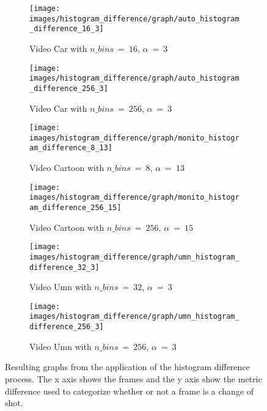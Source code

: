 \documentclass[journal]{IEEEtran}
\begin{document}
\begin{figure}
	\centering
	\begin{subfigure}{0.23\textwidth}
		\centering
		\texttt{[image: images/histogram\_difference/graph/auto\_histogram\_difference\_16\_3]} 
		\caption{Video Car with $n\_bins~=~16$, $\alpha~=~3$}
		\label{fig:histogram_difference:graph:car_16_3} 
	\end{subfigure}
	\centering
	\begin{subfigure}{0.23\textwidth}
		\centering
		\texttt{[image: images/histogram\_difference/graph/auto\_histogram\_difference\_256\_3]} 
		\caption{Video Car with $n\_bins~=~256$, $\alpha~=~3$}
		\label{fig:histogram_difference:graph:car_256_3} 
	\end{subfigure}


	\centering
	\begin{subfigure}{0.23\textwidth}
		\centering
		\texttt{[image: images/histogram\_difference/graph/monito\_histogram\_difference\_8\_13]} 
		\caption{Video Cartoon with $n\_bins~=~8$, $\alpha~=~13$}
		\label{fig:histogram_difference:graph:cartoon_8_13} 
	\end{subfigure}
	\centering
	\begin{subfigure}{0.23\textwidth}
		\centering
		\texttt{[image: images/histogram\_difference/graph/monito\_histogram\_difference\_256\_15]} 
		\caption{Video Cartoon with $n\_bins~=~256$, $\alpha~=~15$}
		\label{fig:histogram_difference:graph:cartoon_256_15} 
	\end{subfigure}


	\centering
	\begin{subfigure}{0.23\textwidth}
		\centering
		\texttt{[image: images/histogram\_difference/graph/umn\_histogram\_difference\_32\_3]} 
		\caption{Video Umn with $n\_bins~=~32$, $\alpha~=~3$}
		\label{fig:histogram_difference:graph:umn_32_3} 
	\end{subfigure}
	\centering
	\begin{subfigure}{0.23\textwidth}
		\centering
		\texttt{[image: images/histogram\_difference/graph/umn\_histogram\_difference\_256\_3]} 
		\caption{Video Umn with $n\_bins~=~256$, $\alpha~=~3$}
		\label{fig:histogram_difference:graph:umn_256_3} 
	\end{subfigure}
	
	
	\caption{Resulting graphs from the application of the histogram difference process. The x axis shows the frames and the y axis show the metric difference used to categorize whether or not a frame is a change of shot.}
	\label{fig:histogram_difference:graph}
\end{figure}
\end{document}

